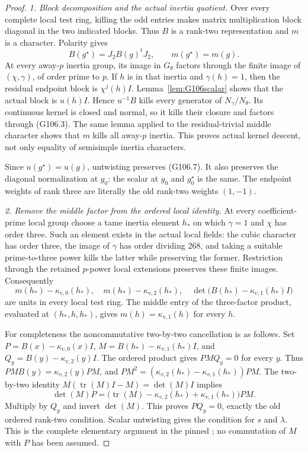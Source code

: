 \begin{proof}
\emph{1. Block decomposition and the actual inertia quotient.}
Over every complete local test ring, killing the odd entries makes
matrix multiplication block diagonal in the two indicated blocks.
Thus \(B\) is a rank-two representation and \(m\) is a character.
Polarity gives
\[
 B(g^\star)=J_2B(g)^tJ_2,
 \qquad m(g^\star)=m(g).
 \tag{G106.7}
\]
At every away-\(p\) inertia group, its image in \(G_\theta\)
factors through the finite image of \((\chi,\gamma)\), of order
prime to \(p\).  If \(h\) is in that inertia and \(\gamma(h)=1\),
then the residual endpoint block is \(\chi^j(h)I\).
Lemma~\ref{lem:G106scalar} shows that the actual block is
\(u(h)I\).  Hence \(u^{-1}B\) kills every generator of
\(N_\gamma/N_\theta\).  Its continuous kernel is closed and
normal, so it kills their closure and factors through (G106.3).
The same lemma applied to the residual-trivial middle character
shows that \(m\) kills all away-\(p\) inertia.
This proves actual kernel descent, not only equality of semisimple
inertia characters.

Since \(u(g^\star)=u(g)\), untwisting preserves (G106.7).
It also preserves the diagonal normalization at \(g_0\): the
scalar at \(g_0\) and \(g_0^\star\) is the same.
The endpoint weights of rank three are literally the old rank-two
weights \((1,-1)\).

\emph{2. Remove the middle factor from the ordered local identity.}
At every coefficient-prime local group choose a tame inertia element
\(h_*\) on which \(\gamma=1\) and \(\chi\) has order three.
Such an element exists in the actual local fields: the cubic
character has order three, the image of \(\gamma\) has order dividing
\(268\), and taking a suitable prime-to-three power kills the latter
while preserving the former.  Restriction through the retained
\(p\)-power local extensions preserves these finite images.
Consequently
\[
 m(h_*)-\kappa_{v,0}(h_*),\quad
 m(h_*)-\kappa_{v,2}(h_*),\quad
 \det\bigl(B(h_*)-\kappa_{v,1}(h_*)I\bigr)
 \tag{G106.8}
\]
are units in every local test ring.
The middle entry of the three-factor product, evaluated at
\((h_*,h,h_*)\), gives
\(m(h)=\kappa_{v,1}(h)\) for every \(h\).

For completeness the noncommutative two-by-two cancellation is as
follows.  Set \(P=B(x)-\kappa_{v,0}(x)I\),
\(M=B(h_*)-\kappa_{v,1}(h_*)I\), and
\(Q_y=B(y)-\kappa_{v,2}(y)I\).
The ordered product gives \(PMQ_y=0\) for every \(y\).
Thus \(PMB(y)=\kappa_{v,2}(y)PM\), and
\(PM^2=(\kappa_{v,2}(h_*)-\kappa_{v,1}(h_*))PM\).
The two-by-two identity
\(M(\operatorname{tr}(M)I-M)=\det(M)I\) implies
\[
 \det(M)P=
 \bigl(\operatorname{tr}(M)-\kappa_{v,2}(h_*)+
                  \kappa_{v,1}(h_*)\bigr)PM.
 \tag{G106.9}
\]
Multiply by \(Q_y\) and invert \(\det(M)\).  This proves
\(PQ_y=0\), exactly the old ordered rank-two condition.
Scalar untwisting gives the condition for \(s\) and \(\lambda\).
This is the complete elementary argument in the pinned
; no commutation of \(M\)
with \(P\) has been assumed.


\end{proof}
